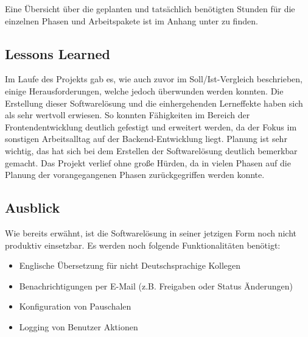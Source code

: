 Eine Übersicht über die geplanten und tatsächlich benötigten Stunden für die einzelnen Phasen und Arbeitspakete ist im Anhang unter  zu finden.

\subsection{Lessons Learned}
\label{sec:Abschlussphase:Lessons Learned}

Im Laufe des Projekts gab es, wie auch zuvor im Soll/Ist-Vergleich beschrieben, einige Herausforderungen, welche jedoch überwunden werden konnten. Die Erstellung dieser Softwarelösung und die einhergehenden Lerneffekte haben sich als sehr wertvoll erwiesen. So konnten Fähigkeiten im Bereich der Frontendentwicklung deutlich gefestigt und erweitert werden, da der Fokus im sonstigen Arbeitsalltag auf der Backend-Entwicklung liegt. Planung ist sehr wichtig, das hat sich bei dem Erstellen der Softwarelösung deutlich bemerkbar gemacht. Das Projekt verlief ohne große Hürden, da in vielen Phasen auf die Planung der vorangegangenen Phasen zurückgegriffen werden konnte.

\subsection{Ausblick}
\label{sec:Abschlussphase:Ausblick}
Wie bereits erwähnt, ist die Softwarelösung in seiner jetzigen Form noch nicht produktiv einsetzbar. Es werden noch folgende Funktionalitäten benötigt:

\begin{itemize}
    \item Englische Übersetzung für nicht Deutschsprachige Kollegen
    \item Benachrichtigungen per E-Mail (z.B. Freigaben oder Status Änderungen)
    \item Konfiguration von Pauschalen
    \item Logging von Benutzer Aktionen
\end{itemize}
